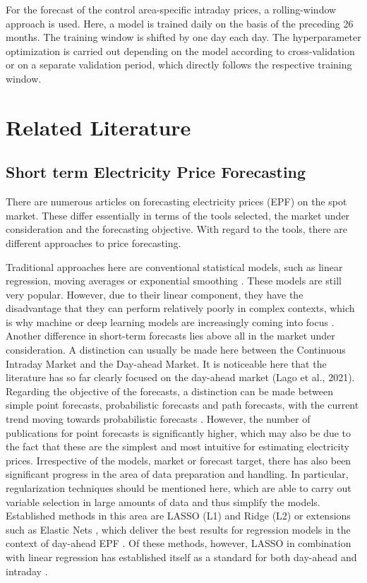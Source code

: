 \documentclass[preprint,12pt,nonatbib]{elsarticle}
\begin{document}
For the forecast of the control area-specific intraday prices, a rolling-window approach is used.
Here, a model is trained daily on the basis of the preceding 26 months.
The training window is shifted by one day each day.
The hyperparameter optimization is carried out depending on the model according to cross-validation or on a separate validation period, which directly follows the respective training window.

\section{Related Literature}
\subsection{Short term Electricity Price Forecasting}
There are numerous articles on forecasting electricity prices (EPF) on the spot market.
These differ essentially in terms of the tools selected, the market under consideration and the forecasting objective.
With regard to the tools, there are different approaches to price forecasting.

Traditional approaches here are conventional statistical models, such as linear regression, moving averages or exponential smoothing \cite{Lago.2018,Naumzik.2021, Abunofal.2021, Maciejowska.2022, CantilloLuna.2023}.
These models are still very popular.
However, due to their linear component, they have the disadvantage that they can perform relatively poorly in complex contexts, which is why machine or deep learning models are increasingly coming into focus \cite{Amjady.2006, Lago.2018b, Lago.2021, CantilloLuna.2023}.
Another difference in short-term forecasts lies above all in the market under consideration.
A distinction can usually be made here between the Continuous Intraday Market and the Day-ahead Market.
It is noticeable here that the literature has so far clearly focused on the day-ahead market (Lago et al., 2021).
Regarding the objective of the forecasts, a distinction can be made between simple point forecasts, probabilistic forecasts and path forecasts, with the current trend moving towards probabilistic forecasts \cite{Nowotarski.2018, Ziel.2018, Maciejowska.2022, Marcjasz.2023}.
However, the number of publications for point forecasts is significantly higher, which may also be due to the fact that these are the simplest and most intuitive for estimating electricity prices.
Irrespective of the models, market or forecast target, there has also been significant progress in the area of data preparation and handling.
In particular, regularization techniques should be mentioned here, which are able to carry out variable selection in large amounts of data and thus simplify the models.
Established methods in this area are LASSO (L1) \cite{Narajewski.2020} and Ridge (L2) or extensions such as Elastic Nets \cite{Zou.2005}, which deliver the best results for regression models in the context of day-ahead EPF \cite{Uniejewski.2016}.
Of these methods, however, LASSO in combination with linear regression has established itself as a standard for both day-ahead and intraday \cite{Maciejowska.2022}.
\end{document}
